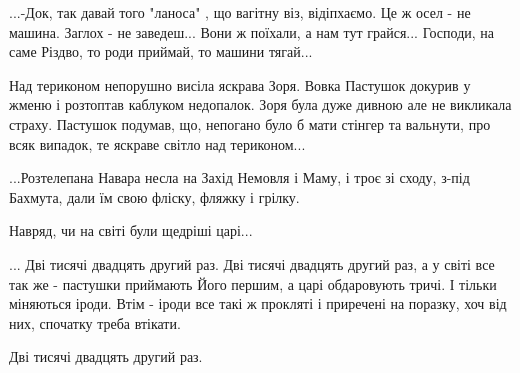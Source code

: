 ...-Док, так давай того "ланоса" , що вагітну віз, відіпхаємо. Це ж осел - не
машина. Заглох - не заведеш... Вони ж поїхали, а нам тут грайся...  Господи, на
саме Різдво, то роди приймай, то машини тягай...  

Над териконом непорушно висіла яскрава Зоря. Вовка Пастушок докурив у жменю  і
розтоптав каблуком недопалок. Зоря була дуже дивною але не викликала страху.
Пастушок подумав, що, непогано було б мати стінгер та вальнути, про всяк
випадок, те яскраве світло над териконом... 

...Розтелепана Навара несла на Захід Немовля і Маму, і троє зі сходу, з-під
Бахмута, дали їм свою фліску, фляжку і грілку. 

Навряд, чи на світі були щедріші царі...   

... Дві тисячі двадцять другий раз. Дві тисячі двадцять другий раз, а у світі
все так же - пастушки приймають Його першим, а царі обдаровують тричі. І тільки
міняються іроди. Втім - іроди все такі ж прокляті і приречені на поразку, хоч
від них, спочатку треба втікати.

Дві тисячі двадцять другий раз.
